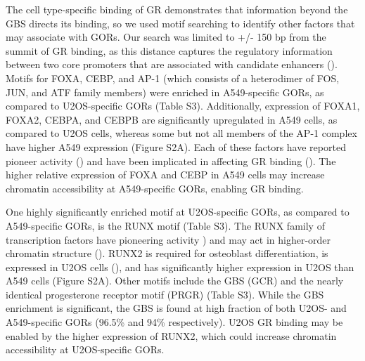 \documentclass{article}
\begin{document}
{The cell type-specific binding of GR demonstrates that information beyond the GBS directs its binding, so we used motif searching to identify other factors that may associate with GORs. Our search was limited to +/- 150 bp from the summit of GR binding, as this distance captures the regulatory information between two core promoters that are associated with candidate enhancers (\cite{core_analysis_2014, scruggs_bidirectional_2015, tippens_transcription_2020}). Motifs for FOXA, CEBP, and AP-1 (which consists of a heterodimer of FOS, JUN, and ATF family members) were enriched in A549-specific GORs, as compared to U2OS-specific GORs (Table S3). Additionally, expression of FOXA1, FOXA2, CEBPA, and CEBPB are significantly upregulated in A549 cells, as compared to U2OS cells, whereas some but not all members of the AP-1 complex have higher A549 expression (Figure S2A). Each of these factors have reported pioneer activity (\cite{lupien_foxa1_2008, belikov_foxa1_2009, biddie_transcription_2011, grontved_cebp_2013}) and have been implicated in affecting GR binding (\cite{so_determinants_2007, belikov_foxa1_2009, biddie_transcription_2011, grontved_cebp_2013, starick_chip-exo_2015, vockley_direct_2016, mcdowell_glucocorticoid_2018, hoffman_brg1_2018}). The higher relative expression of FOXA and CEBP in A549 cells may increase chromatin accessibility at A549-specific GORs, enabling GR binding. 

One highly significantly enriched motif at U2OS-specific GORs, as compared to A549-specific GORs, is the RUNX motif (Table S3). The RUNX family of transcription factors have pioneering activity \cite{wang_transcription_2018, veeken_natural_2019, lee_runx3_2019}) and may act in higher-order chromatin structure (\cite{barutcu_runx1_2016}). RUNX2 is required for osteoblast differentiation, is expressed in U2OS cells (\cite{komori_regulation_2005, lucero_cancer-related_2013}), and has significantly higher expression in U2OS than A549 cells (Figure S2A). Other motifs include the GBS (GCR) and the nearly identical progesterone receptor motif (PRGR) (Table S3). While the GBS enrichment is significant, the GBS is found at high fraction of both U2OS- and A549-specific GORs (96.5\% and 94\% respectively). U2OS GR binding may be enabled by the higher expression of RUNX2, which could increase chromatin accessibility at U2OS-specific GORs.

}
\end{document}
